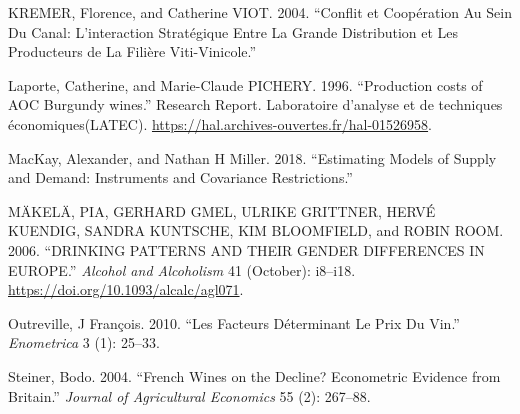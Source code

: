 \documentclass[11pt,]{article}
\begin{document}
\leavevmode\hypertarget{ref-kremer2004}{}%
KREMER, Florence, and Catherine VIOT. 2004. ``Conflit et Coopération Au
Sein Du Canal: L'interaction Stratégique Entre La Grande Distribution et
Les Producteurs de La Filière Viti-Vinicole.''

\leavevmode\hypertarget{ref-laporte1996}{}%
Laporte, Catherine, and Marie-Claude PICHERY. 1996. ``Production costs
of AOC Burgundy wines.'' Research Report. Laboratoire d'analyse et de
techniques économiques(LATEC).
\url{https://hal.archives-ouvertes.fr/hal-01526958}.

\leavevmode\hypertarget{ref-mackay2018}{}%
MacKay, Alexander, and Nathan H Miller. 2018. ``Estimating Models of
Supply and Demand: Instruments and Covariance Restrictions.''

\leavevmode\hypertarget{ref-makela2006}{}%
MÄKELÄ, PIA, GERHARD GMEL, ULRIKE GRITTNER, HERVÉ KUENDIG, SANDRA
KUNTSCHE, KIM BLOOMFIELD, and ROBIN ROOM. 2006. ``DRINKING PATTERNS AND
THEIR GENDER DIFFERENCES IN EUROPE.'' \emph{Alcohol and Alcoholism} 41
(October): i8--i18. \url{https://doi.org/10.1093/alcalc/agl071}.

\leavevmode\hypertarget{ref-outreville2010}{}%
Outreville, J François. 2010. ``Les Facteurs Déterminant Le Prix Du
Vin.'' \emph{Enometrica} 3 (1): 25--33.

\leavevmode\hypertarget{ref-steiner2004}{}%
Steiner, Bodo. 2004. ``French Wines on the Decline? Econometric Evidence
from Britain.'' \emph{Journal of Agricultural Economics} 55 (2):
267--88.
\end{document}
